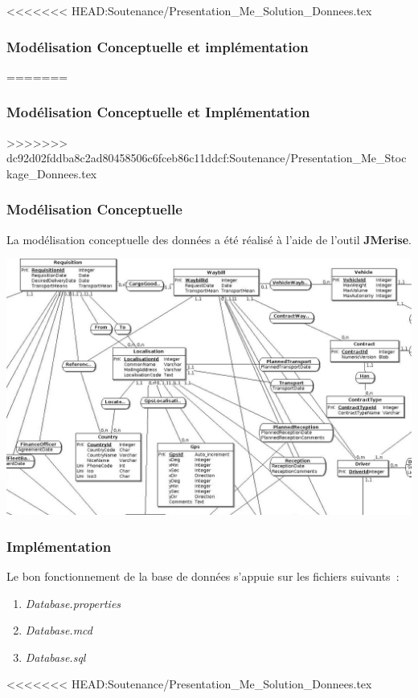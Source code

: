 <<<<<<< HEAD:Soutenance/Presentation_Me_Solution_Donnees.tex
\subsubsection[Modélisation Conceptuelle et implémentation]{Modélisation Conceptuelle et implémentation}
=======
\subsubsection{Modélisation Conceptuelle et Implémentation}

>>>>>>> dc92d02fddba8c2ad80458506c6fceb86c11ddcf:Soutenance/Presentation_Me_Stockage_Donnees.tex
\begin{frame}
\frametitle{Modélisation Conceptuelle}
La modélisation conceptuelle des données a été réalisé à l'aide de l'outil \textbf{JMerise}.\\
\begin{center}
\includegraphics[scale=0.15]{Images/DatabaseSize}
\end{center}
\end{frame}

\begin{frame}
\frametitle{Implémentation}
Le bon fonctionnement de la base de données s'appuie sur les fichiers suivants~:
\begin{enumerate}
	\item<2-> \emph{Database.properties}
	\item<3-> \emph{Database.mcd}
	\item<4-> \emph{Database.sql}
\end{enumerate}
\end{frame}

<<<<<<< HEAD:Soutenance/Presentation_Me_Solution_Donnees.tex
